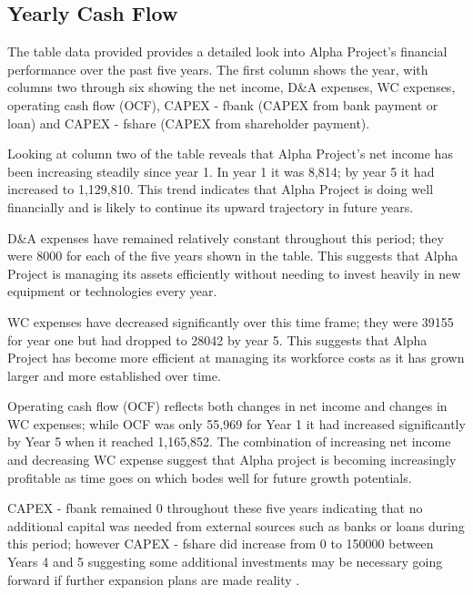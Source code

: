 

\subsection{Yearly Cash Flow}\label{sec:title}

The table data provided provides a detailed look into Alpha Project's financial performance over the past five years. The first column shows the year, with columns two through six showing the net income, D&A expenses, WC expenses, operating cash flow (OCF), CAPEX - fbank (CAPEX from bank payment or loan) and CAPEX - fshare (CAPEX from shareholder payment). 

Looking at column two of the table reveals that Alpha Project's net income has been increasing steadily since year 1. In year 1 it was 8,814; by year 5 it had increased to 1,129,810. This trend indicates that Alpha Project is doing well financially and is likely to continue its upward trajectory in future years. 

D&A expenses have remained relatively constant throughout this period; they were 8000 for each of the five years shown in the table. This suggests that Alpha Project is managing its assets efficiently without needing to invest heavily in new equipment or technologies every year. 

WC expenses have decreased significantly over this time frame; they were 39155 for year one but had dropped to 28042 by year 5. This suggests that Alpha Project has become more efficient at managing its workforce costs as it has grown larger and more established over time. 

Operating cash flow (OCF) reflects both changes in net income and changes in WC expenses; while OCF was only 55,969 for Year 1 it had increased significantly by Year 5 when it reached 1,165,852. The combination of increasing net income and decreasing WC expense suggest that Alpha project is becoming increasingly profitable as time goes on which bodes well for future growth potentials. 

 CAPEX - fbank remained 0 throughout these five years indicating that no additional capital was needed from external sources such as banks or loans during this period; however CAPEX - fshare did increase from 0 to 150000 between Years 4 and 5 suggesting some additional investments may be necessary going forward if further expansion plans are made reality . 

